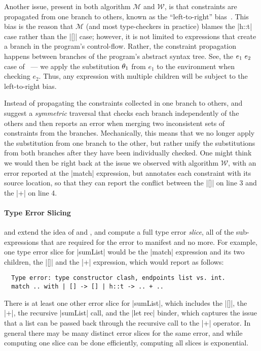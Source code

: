 Another issue, present in both algorithm $\mathcal{M}$ and
$\mathcal{W}$, is that constraints are propagated from one branch to
others, known as the ``left-to-right'' bias~\citep{McAdam1998-ub}.
%
This bias is the reason that $\mathcal{M}$ (and most type-checkers in
practice) blames the |h::t| case rather than the |[]| case; however,
it is not limited to expressions that create a branch in the program's
control-flow.
%
Rather, the constraint propagation happens between branches of the
program's abstract syntax tree.
%
See, \eg the $e_1\ e_2$ case of \W\ --- we apply the substitution
$\theta_1$ from $e_1$ to the environment when checking $e_2$.
%
Thus, any expression with multiple children will be subject to the
left-to-right bias.

Instead of propagating the constraints collected in one branch to
others, \citet{McAdam1998-ub} and \citet{Yang1999-yr} suggest a
\emph{symmetric} traversal that checks each branch independently of the
others and then reports an error when merging two inconsistent sets of
constraints from the branches.
%
Mechanically, this means that we no longer apply the substitution from
one branch to the other, but rather unify the substitutions from both
branches after they have been individually checked.
%
One might think we would then be right back at the issue we observed
with algorithm $\mathcal{W}$, with an error reported at the |match|
expression, but \citeauthor{Yang1999-yr} annotates each constraint with
its source location, so that they can report the conflict between the
|[]| on line 3 and the |+| on line 4.

\paragraph{Type Error Slicing}
\citet{Tip2001-qp} and \citet{Haack2003-vc} extend the idea of
\citeauthor{McAdam1998-ub} and \citeauthor{Yang1999-yr}, and compute a
full type error \emph{slice}, \ie all of the sub-expressions that are
required for the error to manifest and no more.
%
For example, one type error slice for |sumList| would be the |match|
expression and its two children, the |[]| and the |+| expression,
which \cite{Haack2003-vc} would report as follows:
%
\begin{verbatim}
  Type error: type constructor clash, endpoints list vs. int.
  match .. with | [] -> [] | h::t -> .. + ..
\end{verbatim}
%
There is at least one other error slice for |sumList|, which includes
the |[]|, the |+|, the recursive |sumList| call, and the |let rec|
binder, which captures the issue that a list can be passed back through
the recursive call to the |+| operator.
%
In general there may be many distinct error slices for the same error,
and while computing one slice can be done efficiently,
computing all slices is exponential.

